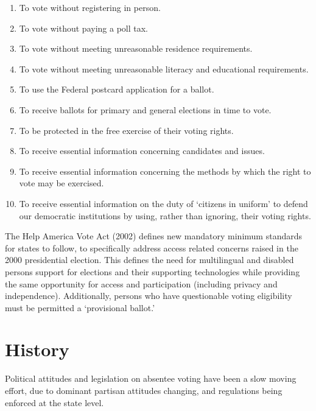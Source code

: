 \begin{enumerate}
  \item To vote without registering in person.
  \item To vote without paying a poll tax.
  \item To vote without meeting unreasonable residence requirements.
  \item To vote without meeting unreasonable literacy and educational requirements.
  \item To use the Federal postcard application for a ballot.
  \item To receive ballots for primary and general elections in time to vote.
  \item To be protected in the free exercise of their voting rights.
  \item To receive essential information concerning candidates and issues.
  \item To receive essential information concerning the methods by which the right to vote may be exercised.
  \item To receive essential information on the duty of `citizens in uniform' to defend our democratic institutions by using, rather than ignoring, their voting rights.
\end{enumerate}

The Help America Vote Act (2002) defines new mandatory minimum standards for
states to follow, to specifically address access related concerns raised in the
2000 presidential election. This defines the need for multilingual and disabled
persons support for elections and their supporting technologies while providing
the same opportunity for access and participation (including privacy and
independence). Additionally, persons who have questionable voting eligibility
must be permitted a `provisional ballot.' 



\section{History}
Political attitudes and legislation on absentee voting have been a slow moving
effort, due to dominant partisan attitudes changing, and regulations being
enforced at the state level.


